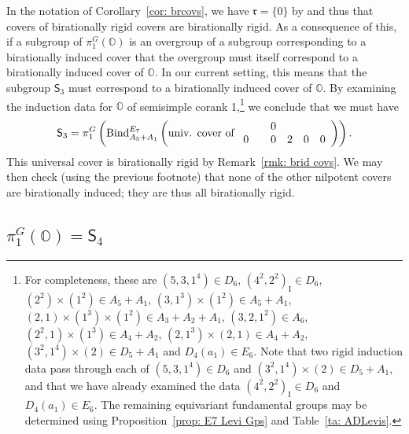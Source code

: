 \documentclass[11pt]{amsart}
\renewcommand{\O}{{\mathbb O}}
\renewcommand{\r}{{\mathfrak r}}
\newcommand{\I}{{\mathfrak I}}
\renewcommand{\I}{{\operatorname{I}}}
\newcommand{\Sym}{{\mathsf{S}}}
\newcommand{\BInd}{{{\mbox{\rm Bind}}}}
\numberwithin{equation}{section}
\begin{document}
	In the notation of Corollary~\ref{cor: brcovs}, we have $\r=\{0\}$ by \cite[\S13.1]{Car} and thus that covers of birationally rigid covers are birationally rigid. As a consequence of this, if a subgroup of $\pi_1^G(\O)$ is an overgroup of a subgroup corresponding to a birationally induced cover that the overgroup must itself correspond to a birationally induced cover of $\O$. In our current setting, this means that the subgroup $\Sym_3$ must correspond to a birationally induced cover of $\O$. By examining the induction data for $\O$ of semisimple corank 1,\footnote{For completeness, these are $(5,3,1^4)\in  D_6$, $(4^2,2^2)_\I\in D_6$, $(2^2)\times (1^2)\in A_5+A_1$, $(3,1^3)\times (1^2)\in A_5+A_1$, $(2,1)\times (1^3)\times (1^2)\in A_3+A_2+A_1$, $(3,2,1^2)\in A_6$, $(2^2,1)\times (1^3)\in A_4+A_2$, $(2,1^3)\times (2,1)\in A_4+A_2$, $(3^2,1^4)\times (2)\in D_5+A_1$ and $D_4(a_1)\in E_6$. Note that two rigid induction data pass through each of $(5,3,1^4)\in  D_6$ and $(3^2,1^4)\times (2)\in D_5+A_1$, and that we have already examined the data $(4^2,2^2)_\I\in D_6$ and $D_4(a_1)\in E_6$. The remaining equivariant fundamental groups may be determined using Proposition~\ref{prop: E7 Levi Gps} and Table~\ref{ta: ADLevis}.} we conclude that we must have $$\Sym_3=\pi_1^G\left(\BInd_{A_5 + A_1}^{E_7}\left(\mbox{univ. cover of }\begin{array}{c c c c c c}
		& & 0 & & &  \\
		0 &  & 0 & 2 & 0 & 0
	\end{array}\right)\right).$$ This universal cover is birationally rigid by Remark~\ref{rmk: brid covs}. We may then check (using the previous footnote) that none of the other nilpotent covers are birationally induced; they are thus all birationally rigid.
	
	\subsection{\texorpdfstring{$\pi_1^G(\O)=\Sym_4$}{pi=S4}}\label{ss: pi=S4}
	
\end{document}
